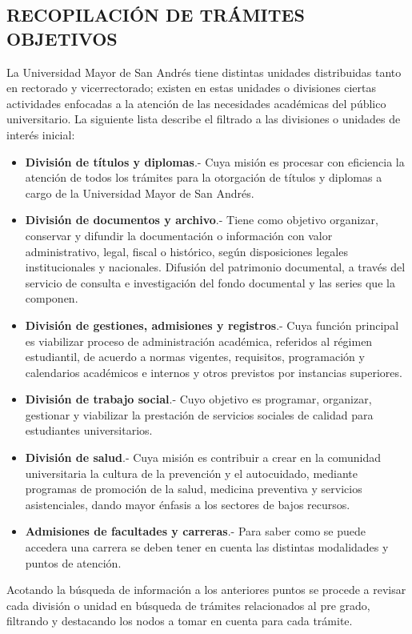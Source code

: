 \documentclass[letter, openright, 12pt]{book}
\begin{document}
\subsection{RECOPILACIÓN DE TRÁMITES OBJETIVOS}
La Universidad Mayor de San Andrés tiene distintas unidades distribuidas tanto en rectorado y vicerrectorado; existen en estas unidades o divisiones ciertas actividades enfocadas a la atención de las necesidades académicas del público universitario. La siguiente lista describe el filtrado a las divisiones o unidades de interés inicial: 
\begin{itemize}
\item \textbf{División de títulos y diplomas}.- Cuya misión es procesar con eficiencia la atención de todos los trámites para la otorgación de títulos y diplomas a cargo de la Universidad Mayor de San Andrés.
\item \textbf{División de documentos y archivo}.- Tiene como objetivo 
organizar, conservar y difundir la documentación o información con valor administrativo, legal, fiscal o histórico, según disposiciones legales institucionales y nacionales. Difusión del patrimonio documental, a través del servicio de consulta e investigación del fondo documental y las series que la componen. 
\item \textbf{División de gestiones, admisiones y registros}.- Cuya función principal es viabilizar proceso de administración académica, referidos al régimen estudiantil, de acuerdo a normas vigentes, requisitos, programación y calendarios académicos e internos y otros previstos por instancias superiores.
\item \textbf{División de trabajo social}.- Cuyo objetivo es programar, organizar, gestionar y viabilizar la prestación de servicios sociales de calidad para estudiantes universitarios.
\item \textbf{División de salud}.- Cuya misión es contribuir a crear en la comunidad universitaria la cultura de la prevención y el autocuidado, mediante programas de promoción de la salud, medicina preventiva y servicios asistenciales, dando mayor énfasis a los sectores de bajos recursos.
\item \textbf{Admisiones de facultades y carreras}.- Para saber como se puede accedera una carrera se deben tener en cuenta las distintas modalidades y puntos de atención.
\end{itemize}

Acotando la búsqueda de información a los anteriores puntos se procede a revisar cada división o unidad en búsqueda de trámites relacionados al pre grado, filtrando y destacando los nodos a tomar en cuenta para cada trámite. 
\end{document}
